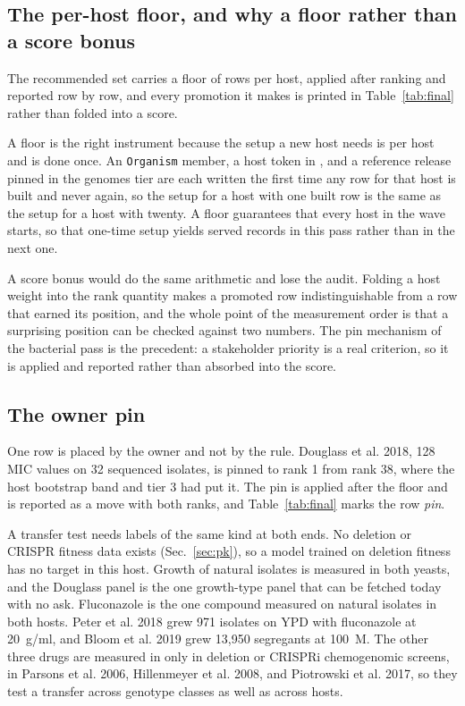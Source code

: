 \subsection{The per-host floor, and why a floor rather than a score bonus}\label{sec:floor}

The recommended set carries a floor of rows per host, applied after ranking and reported row by
row, and every promotion it makes is printed in Table~\ref{tab:final} rather than folded into a
score.

A floor is the right instrument because the setup a new host needs is per host and is done
once. An \texttt{Organism} member, a host token in , and a
reference release pinned in the genomes tier are each written the first time any row for that
host is built and never again, so the setup for a host with one built row is the same as the
setup for a host with twenty. A floor guarantees that every host in the wave starts, so that
one-time setup yields served records in this pass rather than in the next one.

A score bonus would do the same arithmetic and lose the audit. Folding a host weight into the
rank quantity makes a promoted row indistinguishable from a row that earned its position, and
the whole point of the measurement order is that a surprising position can be checked against
two numbers. The pin mechanism of the bacterial pass is the precedent: a stakeholder priority
is a real criterion, so it is applied and reported rather than absorbed into the score.

\subsection{The owner pin}\label{sec:pin}

One row is placed by the owner and not by the rule. Douglass et al. 2018, 128 MIC values on 32
sequenced  isolates, is pinned to rank 1 from rank 38, where the host
bootstrap band and tier 3 had put it. The pin is applied after the floor and is reported as a
move with both ranks, and Table~\ref{tab:final} marks the row \emph{pin}.

A transfer test needs labels of the same kind at both ends. No  deletion or CRISPR fitness data exists
(Sec.~\ref{sec:pk}), so a model trained on  deletion fitness has no
target in this host. Growth of natural isolates is measured in both yeasts, and the Douglass
panel is the one  growth-type panel that can be fetched today with no
ask. Fluconazole is the one compound measured on natural isolates in both hosts. Peter et al.
2018 grew 971  isolates on YPD with fluconazole at 20~\textmu g/ml, and Bloom
et al. 2019 grew 13,950 segregants at 100~\textmu M. The other three drugs are
measured in  only in deletion or CRISPRi chemogenomic screens, in Parsons
et al. 2006, Hillenmeyer et al. 2008, and Piotrowski et al. 2017, so they test a transfer across genotype
classes as well as across hosts.


